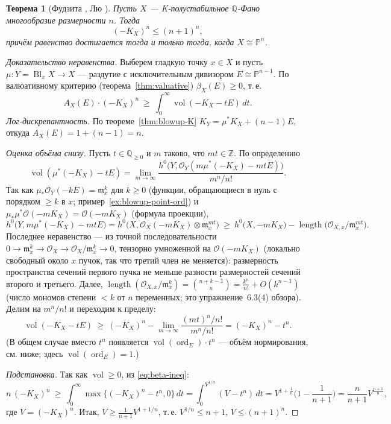 \documentclass[11pt,a4paper]{article}
\theoremstyle{plain}
\newtheorem{theorem}{Теорема}[section]
\theoremstyle{definition}
\theoremstyle{remark}
\newcommand{\Z}{\mathbb{Z}}
\newcommand{\Q}{\mathbb{Q}}
\newcommand{\PP}{\mathbb{P}}
\newcommand{\cO}{\mathcal{O}}
\newcommand{\mm}{\mathfrak{m}}
\DeclareMathOperator{\ord}{ord}
\DeclareMathOperator{\Bl}{Bl}
\DeclareMathOperator{\vol}{vol}
\DeclareMathOperator{\length}{length}
\begin{document}
\begin{theorem}[{Фудзита \cite{Fuj18}, Лю \cite{Liu18}}]\label{thm:volume-bound}
Пусть $X$ --- K-полустабильное $\Q$-Фано многообразие размерности $n$. Тогда
\[
(-K_X)^n\le(n+1)^n ,
\]
причём равенство достигается тогда и только тогда, когда $X\cong\PP^n$.
\end{theorem}

\begin{proof}[Доказательство неравенства]
Выберем гладкую точку $x\in X$ и пусть $\mu\colon Y=\Bl_xX\to X$ --- раздутие с исключительным
дивизором $E\cong\PP^{n-1}$. По валюативному критерию (теорема~\ref{thm:valuative})
$\beta_X(E)\ge0$, т.\,е.
\begin{equation}\label{eq:beta-ineq}
A_X(E)\cdot(-K_X)^n\ \ge\ \int_0^\infty\vol(-K_X-tE)\,dt .
\end{equation}
\emph{Лог-дискрепантность.} По теореме~\ref{thm:blowup-K} $K_Y=\mu^*K_X+(n-1)E$, откуда
$A_X(E)=1+(n-1)=n$.

\emph{Оценка объёма снизу.} Пусть $t\in\Q_{\ge0}$ и $m$ таково, что $mt\in\Z$. По определению
\[
\vol(\mu^*(-K_X)-tE)=\lim_{m\to\infty}\frac{h^0\big(Y,\cO_Y(m\mu^*(-K_X)-mtE)\big)}{m^n/n!} .
\]
Так как $\mu_*\cO_Y(-kE)=\mm_x^k$ для $k\ge0$ (функции, обращающиеся в нуль с порядком $\ge k$ в $x$;
пример~\ref{ex:blowup-point-ord}) и $\mu_*\mu^*\cO(-mK_X)=\cO(-mK_X)$ (формула проекции),
\[
h^0\big(Y,m\mu^*(-K_X)-mtE\big)=h^0\big(X,\cO_X(-mK_X)\otimes\mm_x^{mt}\big)
\ \ge\ h^0\big(X,-mK_X\big)-\length\big(\cO_{X,x}/\mm_x^{mt}\big) .
\]
Последнее неравенство --- из точной последовательности $0\to\mm_x^{k}\to\cO_X\to\cO_X/\mm_x^k\to0$,
тензорно умноженной на $\cO(-mK_X)$ (локально свободный около $x$ пучок, так что третий член не
меняется): размерность пространства сечений первого пучка не меньше разности размерностей сечений
второго и третьего. Далее, $\length(\cO_{X,x}/\mm_x^k)=\binom{n+k-1}{n}=\frac{k^n}{n!}+O(k^{n-1})$
(число мономов степени $<k$ от $n$ переменных; это упражнение~6.3(4) обзора). Делим на
$m^n/n!$ и переходим к пределу:
\[
\vol(-K_X-tE)\ \ge\ (-K_X)^n-\lim_{m\to\infty}\frac{(mt)^n/n!}{m^n/n!}=(-K_X)^n-t^n .
\]
(В общем случае вместо $t^n$ появляется $\vol(\ord_E)\cdot t^n$ --- объём нормирования, см. ниже;
здесь $\vol(\ord_E)=1$.)

\emph{Подстановка.} Так как $\vol\ge0$, из \eqref{eq:beta-ineq}:
\[
n\,(-K_X)^n\ \ge\ \int_0^\infty\max\{(-K_X)^n-t^n,0\}\,dt=\int_0^{V^{1/n}}(V-t^n)\,dt
=V^{1+\frac1n}\Big(1-\frac1{n+1}\Big)=\frac n{n+1}V^{\frac{n+1}n},
\]
где $V=(-K_X)^n$. Итак, $V\ge\frac1{n+1}V^{1+1/n}$, т.\,е. $V^{1/n}\le n+1$, $V\le(n+1)^n$.
\end{proof}
\end{document}
